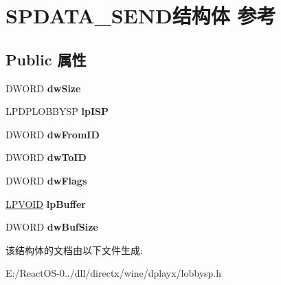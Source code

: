 \hypertarget{struct_s_p_d_a_t_a___s_e_n_d}{}\section{S\+P\+D\+A\+T\+A\+\_\+\+S\+E\+N\+D结构体 参考}
\label{struct_s_p_d_a_t_a___s_e_n_d}
\subsection*{Public 属性}
\begin{DoxyCompactItemize}
\item 
\mbox{\label{struct_s_p_d_a_t_a___s_e_n_d_ace1d501fd96c94eddf9c1c4ce24651bf}} 
D\+W\+O\+RD {\bfseries dw\+Size}
\item 
\mbox{\label{struct_s_p_d_a_t_a___s_e_n_d_a32301a39c76ca3832b2adceb39b6780a}} 
L\+P\+D\+P\+L\+O\+B\+B\+Y\+SP {\bfseries lp\+I\+SP}
\item 
\mbox{\label{struct_s_p_d_a_t_a___s_e_n_d_a4742878c8b7c19c7b772498bfee20d81}} 
D\+W\+O\+RD {\bfseries dw\+From\+ID}
\item 
\mbox{\label{struct_s_p_d_a_t_a___s_e_n_d_ac82eba184274599028aa7cfb17e8f853}} 
D\+W\+O\+RD {\bfseries dw\+To\+ID}
\item 
\mbox{\label{struct_s_p_d_a_t_a___s_e_n_d_a9df2c225042a64efcf46b5e2a734b9fe}} 
D\+W\+O\+RD {\bfseries dw\+Flags}
\item 
\mbox{\label{struct_s_p_d_a_t_a___s_e_n_d_a4be4256e01d86868682ce28836f7e1bb}} 
\hyperlink{interfacevoid}{L\+P\+V\+O\+ID} {\bfseries lp\+Buffer}
\item 
\mbox{\label{struct_s_p_d_a_t_a___s_e_n_d_a4a74a71f5647592b26c794be15c6c659}} 
D\+W\+O\+RD {\bfseries dw\+Buf\+Size}
\end{DoxyCompactItemize}


该结构体的文档由以下文件生成\+:\begin{DoxyCompactItemize}
\item 
E\+:/\+React\+O\+S-\/0../dll/directx/wine/dplayx/lobbysp.\+h\end{DoxyCompactItemize}
